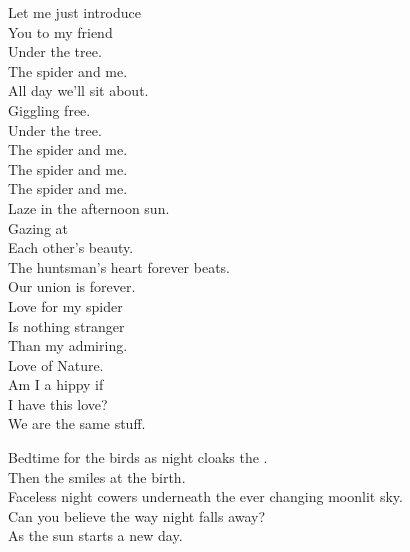 




Let me just introduce \\
You to my friend \\
Under the tree. \\
The spider and me. \\
All day we'll sit about. \\
Giggling free. \\
Under the tree. \\
The spider and me. \\

The spider and me. \\
The spider and me. \\

Laze in the afternoon sun. \\
Gazing at \\
Each other's beauty. \\
The huntsman's heart forever beats. \\
Our union is forever. \\

Love for my spider \\
Is nothing stranger \\
Than my admiring. \\
Love of Nature. \\
Am I a hippy if \\
I have this love? \\
We are the same stuff. \\








Bedtime for the birds as night cloaks the . \\
Then the  smiles at the  birth. \\
Faceless night cowers underneath the ever changing moonlit sky. \\
Can you believe the way night falls away? \\
As the sun starts a new day. \\

